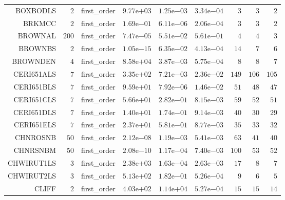 \begin{longtable}{rrrrrrrrr}
BOXBODLS & \(     2\) & first\_order & \( 9.77\)e\(+03\) & \( 1.25\)e\(-03\) & \( 3.34\)e\(-04\) & \(     3\) & \(     3\) & \(     2\) \\
BRKMCC & \(     2\) & first\_order & \( 1.69\)e\(-01\) & \( 6.11\)e\(-06\) & \( 2.06\)e\(-04\) & \(     3\) & \(     3\) & \(     2\) \\
BROWNAL & \(   200\) & first\_order & \( 7.47\)e\(-05\) & \( 5.51\)e\(-02\) & \( 5.61\)e\(-01\) & \(     4\) & \(     4\) & \(     3\) \\
BROWNBS & \(     2\) & first\_order & \( 1.05\)e\(-15\) & \( 6.35\)e\(-02\) & \( 4.13\)e\(-04\) & \(    14\) & \(     7\) & \(     6\) \\
BROWNDEN & \(     4\) & first\_order & \( 8.58\)e\(+04\) & \( 3.87\)e\(-03\) & \( 5.75\)e\(-04\) & \(     8\) & \(     8\) & \(     7\) \\
CERI651ALS & \(     7\) & first\_order & \( 3.35\)e\(+02\) & \( 7.21\)e\(-03\) & \( 2.36\)e\(-02\) & \(   149\) & \(   106\) & \(   105\) \\
CERI651BLS & \(     7\) & first\_order & \( 9.59\)e\(+01\) & \( 7.92\)e\(-06\) & \( 1.46\)e\(-02\) & \(    51\) & \(    48\) & \(    47\) \\
CERI651CLS & \(     7\) & first\_order & \( 5.66\)e\(+01\) & \( 2.82\)e\(-01\) & \( 8.15\)e\(-03\) & \(    59\) & \(    52\) & \(    51\) \\
CERI651DLS & \(     7\) & first\_order & \( 1.40\)e\(+01\) & \( 1.74\)e\(-01\) & \( 9.14\)e\(-03\) & \(    40\) & \(    30\) & \(    29\) \\
CERI651ELS & \(     7\) & first\_order & \( 2.37\)e\(+01\) & \( 5.81\)e\(-01\) & \( 8.77\)e\(-03\) & \(    35\) & \(    33\) & \(    32\) \\
CHNROSNB & \(    50\) & first\_order & \( 2.12\)e\(-08\) & \( 1.19\)e\(-03\) & \( 5.41\)e\(-03\) & \(    63\) & \(    41\) & \(    40\) \\
CHNRSNBM & \(    50\) & first\_order & \( 2.08\)e\(-10\) & \( 1.17\)e\(-04\) & \( 7.40\)e\(-03\) & \(   100\) & \(    53\) & \(    52\) \\
CHWIRUT1LS & \(     3\) & first\_order & \( 2.38\)e\(+03\) & \( 1.63\)e\(-04\) & \( 2.63\)e\(-03\) & \(    17\) & \(     8\) & \(     7\) \\
CHWIRUT2LS & \(     3\) & first\_order & \( 5.13\)e\(+02\) & \( 1.82\)e\(-01\) & \( 5.26\)e\(-04\) & \(     9\) & \(     6\) & \(     5\) \\
CLIFF & \(     2\) & first\_order & \( 4.03\)e\(+02\) & \( 1.14\)e\(+04\) & \( 5.27\)e\(-04\) & \(    15\) & \(    15\) & \(    14\) \\

\end{longtable}
